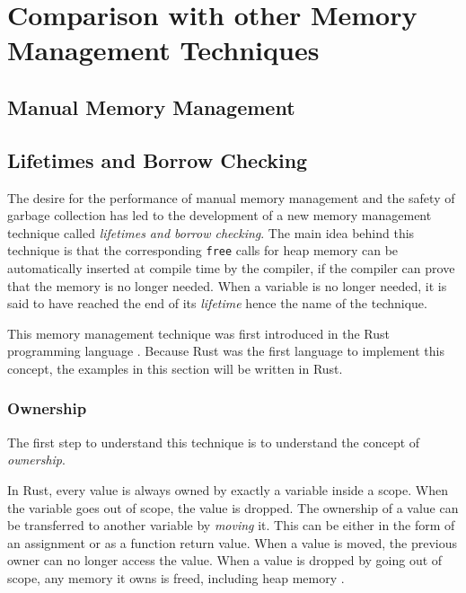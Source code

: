 \chapter{Comparison with other Memory Management Techniques}

\section{Manual Memory Management}

\section{Lifetimes and Borrow Checking}

The desire for the performance of manual memory management and the safety of garbage collection has led to the development
of a new memory management technique called \textit{lifetimes and borrow checking}.
The main idea behind this technique is that the corresponding \texttt{free} calls for heap memory can be automatically inserted
at compile time by the compiler, if the compiler can prove that the memory is no longer needed.
When a variable is no longer needed, it is said to have reached the end of its \textit{lifetime} hence the name of the technique.

This memory management technique was first introduced in the Rust programming language \cite[1. Introduction]{rust_borrow_formalism_2021}.
Because Rust was the first language to implement this concept, the examples in this section will be written in Rust.

\subsection{Ownership}

The first step to understand this technique is to understand the concept of \textit{ownership}.

In Rust, every value is always owned by exactly a variable inside a scope.
When the variable goes out of scope, the value is dropped.
The ownership of a value can be transferred to another variable by \textit{moving} it.
This can be either in the form of an assignment or as a function return value.
When a value is moved, the previous owner can no longer access the value.
When a value is dropped by going out of scope, any memory it owns is freed, including heap memory \cite[59-61]{rust_book_2019}.

